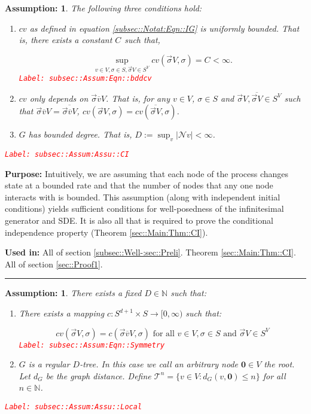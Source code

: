 \documentclass[12pt]{article}
\newcommand{\mb}{\mathbb}
\newcommand{\mc}{\mathcal}
\newcommand{\ra}{\rightarrow}
\newcommand{\ov}{\overline}
\newcommand{\te}{\text}
\newcommand{\tr}{\textcolor{red}}
\newcommand{\labe}[1]{\tr{\texttt{Label: #1}}}
\newcommand{\purpose}{\textbf{Purpose: }}
\newcommand{\usein}{\textbf{Used in: }}
\newcommand{\lin}{\rule{\linewidth}{0.4 pt}}
\newcommand{\defeq}{:=}								%
\renewcommand{\root}{\mathbf{0}}				%
\renewcommand{\v}{v}							%
\renewcommand{\S}{S}							%
\newcommand{\s}{\sigma}							%
\newcommand{\sv}{\vec{\s}}						%
\newcommand{\IGr}{c}							%
\newcommand{\neigh}{\mc{N}}						%
\newcommand{\cl}{\ov}							%
\newcommand{\degr}{D}								%
\newcommand{\tree}{\mc{T}}							%
\newcommand{\numb}{n}								%
\newcommand{\XState}[1]{\S^{#1}}				%
\newcommand{\gdist}{d_G}							%
\newcommand{\const}[1]{C_{#1}}						%
\newtheorem{assu}[thms]{Assumption: }
\begin{document}
\begin{assu}
The following three conditions hold:
\begin{enumerate}
\item \(\IGr{\v}\) as defined in equation \eqref{subsec::Notat:Eqn::IG} is uniformly bounded. That is, there exists a constant \(\const{}\) such that,

\begin{equation}
\sup_{\v\in  V,\s \in \S,\sv{}{ V}\in \S^ V} \IGr{\v}(\sv{}{ V},\s) = \const{} < \infty.
\label{subsec::Assum:Eqn::bddcv}
\end{equation}
\labe{subsec::Assum:Eqn::bddcv}

\item \(\IGr{\v}\) only depends on \(\sv{\cl{\v}}{ V}\). That is, for any \(\v\in  V\), \(\s\in \S\) and \(\sv{}{ V},\ov{\sv{}{ V}} \in \S^ V\) such that \(\sv{\cl{\v}}{ V} = \ov{\sv{\cl{\v}}{ V}}\), \(\IGr{\v}(\sv{}{ V},\s) = \IGr{\v}(\ov{\sv{}{ V}},\s)\).

\item \(G\) has bounded degree. That is, \(\degr \defeq \sup_\v |\neigh{\v}| < \infty\).
\end{enumerate}
\label{subsec::Assum:Assu::CI}\labe{subsec::Assum:Assu::CI}
\end{assu}

\purpose Intuitively, we are assuming that each node of the process changes state at a bounded rate and that the number of nodes that any one node interacts with is bounded. This assumption (along with independent initial conditions) yields sufficient conditions for well-posedness of the infinitesimal generator and SDE. It is also all that is required to prove the conditional independence property (Theorem \ref{sec::Main:Thm::CI}). 

\usein All of section \ref{subsec::Well-:sec::Preli}. Theorem \ref{sec::Main:Thm::CI}. All of section \ref{sec::Proof1}.

\lin

\begin{assu}
There exists a fixed \(\degr\in \mb{N}\) such that:

\begin{enumerate}
\item There exists a mapping \(\IGr{}: \S^{d+1} \times \S \ra [0,\infty)\) such that:

\begin{equation}
\IGr{\v}(\sv{}{ V},\s) = \IGr{}(\sv{\cl{\v}}{ V},\s) \te{ for all } \v\in  V, \s\in \S\te{ and } \sv{}{ V} \in \S^ V
\label{subsec::Assum:Eqn::Symmetry}
\end{equation}
\labe{subsec::Assum:Eqn::Symmetry}

\item \(G\) is a regular \(\degr\)-tree. In this case we call an arbitrary node \(\root\in  V\) the root. Let \(\gdist\) be the graph distance. Define \(\tree^\numb = \{\v \in  V: \gdist(\v,\root) \leq \numb\}\) for all \(\numb\in \mb{N}\).
\end{enumerate}
\label{subsec::Assum:Assu::Local}\labe{subsec::Assum:Assu::Local}
\end{assu}
\end{document}

